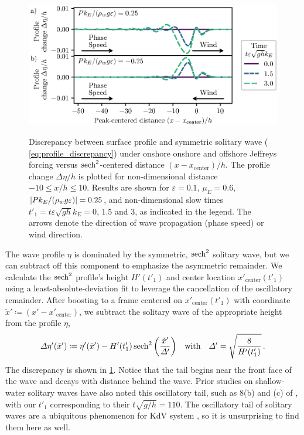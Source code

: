 \documentclass{jfm}
\renewcommand*{\epsilon}{\varepsilon}
\begin{document}
\begin{figure}
  \centering
  { %
    \label{fig:snapshots_solitary_tail:a}
    \label{fig:snapshots_solitary_tail:b}
  }
  \includegraphics{Snapshots-Positive-Negative-Tail.eps}
  \caption{
    Discrepancy between surface profile and symmetric solitary wave
    (\cf{} \cref{eq:profile_discrepancy}) under onshore
     onshore and
     offshore Jeffreys forcing
    versus $\sech^2$-centered distance $(x-x_{\text{center}})/h$.
    The profile change $\Delta \eta/h$ is plotted for non-dimensional
    distance $-10 \le x/h \le 10$.
    Results are shown for $\epsilon=0.1$, $\mu_E = 0.6$, $\abs{P
    k_E/(\rho_w g \epsilon)} = 0.25$, and non-dimensional slow times
    $t'_1 = t \epsilon \sqrt{gh} k_E = 0$, $1.5$ and $3$, as indicated
    in the legend.
    The arrows denote the direction of wave propagation (phase speed) or
    wind direction.
  }\label{fig:snapshots_solitary_tail}
\end{figure}

The wave profile $\eta$ is dominated by the symmetric, $\sech^2$
solitary wave, but we can subtract off this component to emphasize the
asymmetric remainder.
We calculate the $\sech^2$ profile's height $H'(t'_1)$ and center
location $x'_{\text{center}}(t'_1)$ using a least-absolute-deviation fit
to leverage the cancellation of the oscillatory remainder.
After boosting to a frame centered on $x'_{\text{center}}(t'_1)$ with
coordinate $\tilde{x}' \coloneqq (x'-x'_{\text{center}})$, we subtract
the solitary wave of the appropriate height from the profile $\eta$,
\begin{equation}
  \Delta \eta'(\tilde{x}') \coloneqq \eta'(\tilde{x}')
  - H'(t'_1) \sech^2\pqty{\frac{\tilde{x}'}{\Delta'}}
  \qq{with}
  \Delta' = \sqrt{\frac{8}{H'(t'_1)}} \,.
  \label{eq:profile_discrepancy}
\end{equation}
The discrepancy is shown in \cref{fig:snapshots_solitary_tail}.
Notice that the tail begins near the front face of the wave and decays
with distance behind the wave.
Prior studies on shallow-water solitary waves have also noted this
oscillatory tail, such as \figsname{} 8(b) and (c)
of \citet{hammack1974korteweg}, with our $t'_1$ corresponding to their
$t\sqrt{g/h} = \num{110}$.
The oscillatory tail of solitary waves are a ubiquitous phenomenon for
KdV system \citep{mei2005nonlinear}, so it is unsurprising to find them
here as well.
\end{document}
